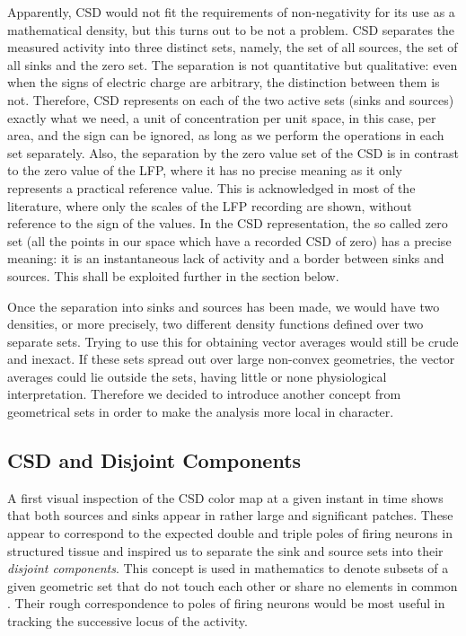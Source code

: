 \documentclass{article}
\begin{document}
Apparently, CSD would not fit the requirements of non-negativity for its use as a mathematical density, but this turns out to be not a problem.  CSD separates the measured activity into three distinct sets, namely, the set of all sources, the set of all sinks and the zero set. The separation is not quantitative but qualitative: even when the signs of electric charge are arbitrary, the distinction between them is not. Therefore, CSD represents on each of the two active sets (sinks and sources) exactly what we need, a unit of concentration per unit space, in this case, per area, and the sign can be ignored, as long as we perform the operations in each set separately. Also, the separation by the zero value set of the CSD is in contrast to the zero value of the LFP, where it has no precise meaning as it only represents a practical reference value. This is acknowledged in most of the literature, where only the scales of the LFP recording are shown, without reference to the sign of the values. In the CSD representation,  the so called zero set (all the points in our space which have a recorded CSD of zero)  has a precise meaning: it is an instantaneous lack of activity and a border between sinks and sources. This shall be exploited further in the section below.

Once the separation into sinks and sources has been made, we would have two densities, or more precisely, two different density functions defined over two separate sets. Trying to use this for obtaining vector averages would still be crude and inexact. If these sets spread out over large non-convex geometries, the vector averages could lie outside the sets, having little or none physiological interpretation. Therefore we decided to introduce another concept from geometrical sets in order to make the analysis more local in character.


\subsection{CSD and Disjoint Components}

A first visual inspection of the CSD color map at a given instant in time shows that both sources and sinks appear in rather large and significant patches. These appear to correspond to the expected double and triple poles of firing neurons in structured tissue \cite{Buzsaki2012} and inspired us to separate the sink and source  sets into their \emph{disjoint components}. This concept is used in mathematics to denote subsets of a given geometric set that do not touch each other or share no elements in common \cite{Halmos}. Their rough correspondence to poles of firing neurons would be most useful in tracking the successive locus of the activity.
\end{document}
